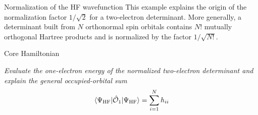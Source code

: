 \documentclass[11pt,a4paper,titlepage]{article}
\numberwithin{equation}{section}
\newcommand{\chO}{\Hat{\mathcal{O}}}
\newcommand{\violet}[1]{\textcolor{hfViolet}{#1}}
\begin{document}
\begin{hfsolution}{Normalization of the HF wavefunction}
This example explains the origin of the normalization factor $1/\sqrt{2}$
for a two-electron determinant. More generally, a determinant built from
$N$ orthonormal spin orbitals contains $N!$ mutually orthogonal Hartree
products and is normalized by the factor $1/\sqrt{N!}$.

\end{hfsolution}


\begin{hfexercise}{Core Hamiltonian}

\violet{\textit{Evaluate the one-electron energy of the normalized
two-electron determinant and explain the general occupied-orbital sum
\[
  \mel{\Psi_\text{HF}}{\chO_1}{\Psi_\text{HF}}
  =
  \sum_{i=1}^{N}h_{ii}
\]
}}

\end{hfexercise}
\end{document}
